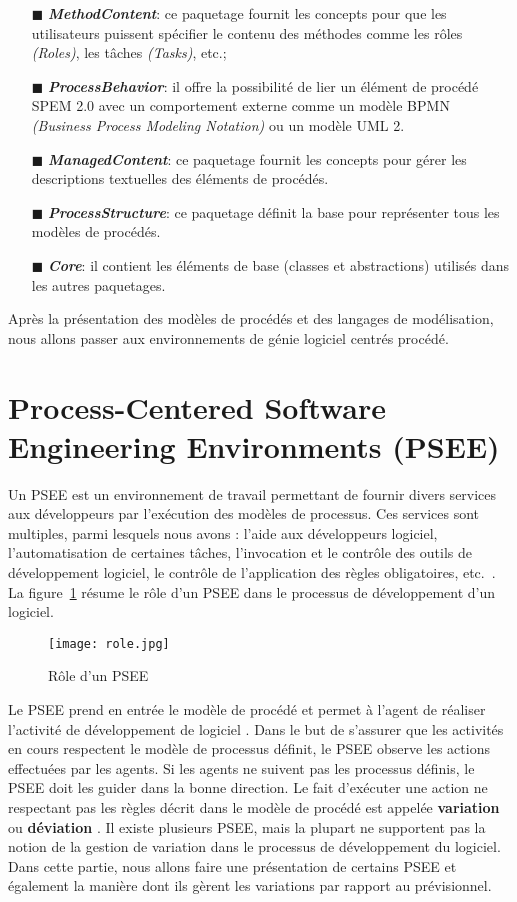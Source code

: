 \begin{itemize}
\begin{itemize}
\begin{itemize}
\item[\tiny{$\blacksquare$}] \textbf{ \textit{MethodContent}}: ce paquetage fournit les concepts pour que les utilisateurs puissent spécifier le contenu des méthodes comme les rôles \textit{(Roles)}, les tâches \textit{(Tasks)}, etc.; 
\item[\tiny{$\blacksquare$}] \textbf{ \textit{ProcessBehavior}}: il offre la possibilité de lier un élément de procédé SPEM 2.0 avec un comportement externe comme un modèle BPMN \textit{(Business Process Modeling Notation)} ou un modèle UML 2.
\item[\tiny{$\blacksquare$}] \textbf{ \textit{ManagedContent}}: ce paquetage fournit les concepts pour gérer les descriptions textuelles des éléments de procédés.
\item[\tiny{$\blacksquare$}] \textbf{ \textit{ProcessStructure}}: ce paquetage définit la base pour représenter tous les modèles de procédés.
\item[\tiny{$\blacksquare$}] \textbf{ \textit{Core}}: il contient les éléments de base (classes et abstractions) utilisés dans les autres paquetages. 
\end{itemize}
\end{itemize} 
\end{itemize}
Après la présentation des modèles de procédés et des langages de modélisation, nous allons passer aux environnements de génie logiciel centrés procédé.
\section{Process-Centered Software Engineering Environments (PSEE)}
Un PSEE est un environnement de travail permettant de fournir divers services aux développeurs par l'exécution des modèles de processus. Ces services sont multiples, parmi lesquels nous avons : l'aide aux développeurs logiciel, l'automatisation de certaines tâches, l'invocation et le contrôle des outils de développement logiciel, le contrôle de l'application des règles obligatoires, etc.~\cite{vra}. \\
La figure~\ref{rolepsee} résume le rôle d'un PSEE dans le processus de développement d'un logiciel.
\begin{figure}[h]
\centering
\texttt{[image: role.jpg]}
\caption{\label{rolepsee}Rôle d'un PSEE~\cite{alm}}
\end{figure}
\clearpage
Le PSEE prend en entrée le modèle de procédé et permet à l'agent de réaliser l'activité de \og développement de logiciel \fg{}. Dans le but de s'assurer que les activités en cours respectent le modèle de processus définit, le PSEE observe les actions effectuées par les agents. Si les agents ne suivent pas les processus définis, le PSEE doit les guider dans la bonne direction. Le fait d'exécuter une action ne respectant pas les règles décrit dans le modèle de procédé est appelée \textbf{\og variation \fg{}} ou \textbf{\og déviation \fg{}}.  
Il existe plusieurs PSEE, mais la plupart ne supportent pas la notion de la gestion de variation dans le processus de développement du logiciel. Dans cette partie, nous allons faire une présentation de certains PSEE et également la manière dont ils gèrent les variations par rapport au prévisionnel.
